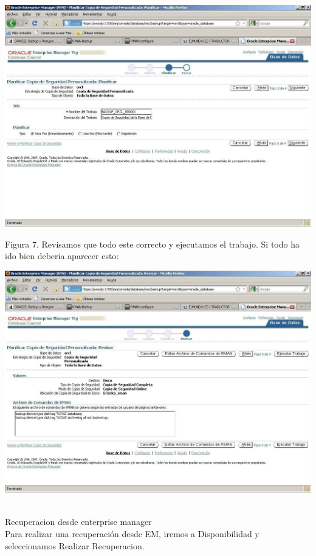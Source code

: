\begin{enumerate}[1.]
	\begin{center}
	\includegraphics[width=15cm]{./Imagenes/eje3}
	\end{center}
	Figura 7. Revisamos que todo este correcto y ejecutamos el trabajo. Si todo ha ido bien deberia aparecer esto:
	\begin{center}
	\includegraphics[width=15cm]{./Imagenes/eje4}
	\end{center}
	\\Recuperacion desde enterprise manager
	\\Para realizar una recuperación desde EM, iremos a Disponibilidad y seleccionamos
Realizar Recuperacion.
	\begin{center}

\end{center}
\end{enumerate}
